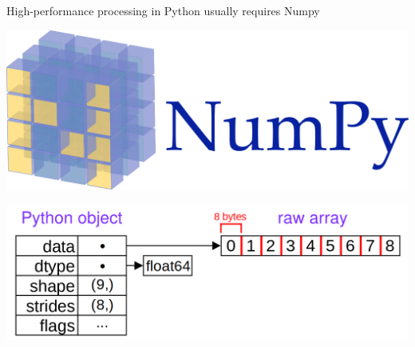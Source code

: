 \documentclass[aspectratio=169]{beamer}
\begin{document}
\begin{frame}{High-performance processing in Python usually requires Numpy}
\vspace{0.5 cm}
\begin{center}
\includegraphics[width=0.35\linewidth]{numpy-logo.png}

\vspace{1 cm}
\includegraphics[width=0.75\linewidth]{numpy-memory-layout.png}
\end{center}
\end{frame}
\end{document}

